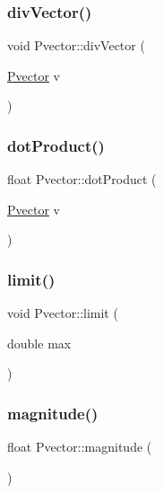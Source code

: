 \mbox{\label{class_pvector_aa855eaf087ce971b0aac806aa486793d}} 
\subsubsection{\texorpdfstring{div\+Vector()}{divVector()}}
{\footnotesize\ttfamily void Pvector\+::div\+Vector (\begin{DoxyParamCaption}\item[{\hyperlink{class_pvector}{Pvector}}]{v }\end{DoxyParamCaption})}

\mbox{\label{class_pvector_a4eecd15faddd549f3d99002c42b846e9}} 
\subsubsection{\texorpdfstring{dot\+Product()}{dotProduct()}}
{\footnotesize\ttfamily float Pvector\+::dot\+Product (\begin{DoxyParamCaption}\item[{\hyperlink{class_pvector}{Pvector}}]{v }\end{DoxyParamCaption})}

\mbox{\label{class_pvector_a2c31c0b80bab261fe888395f781328f1}} 
\subsubsection{\texorpdfstring{limit()}{limit()}}
{\footnotesize\ttfamily void Pvector\+::limit (\begin{DoxyParamCaption}\item[{double}]{max }\end{DoxyParamCaption})}

\mbox{\label{class_pvector_a1aa0154d1d3c92a596610fa366fcfe6c}} 
\subsubsection{\texorpdfstring{magnitude()}{magnitude()}}
{\footnotesize\ttfamily float Pvector\+::magnitude (\begin{DoxyParamCaption}{ }\end{DoxyParamCaption})}

